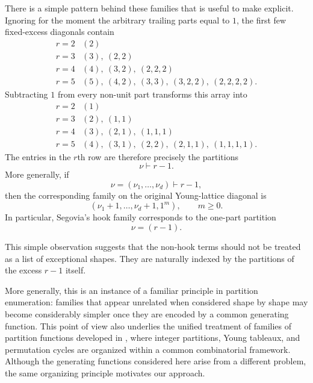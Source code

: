 \documentclass[11pt]{article}
\theoremstyle{definition}
\begin{document}
There is a simple pattern behind these families that is useful to make
explicit.  Ignoring for the moment the arbitrary trailing parts equal
to $1$, the first few fixed-excess diagonals contain
\[
\begin{array}{c|l}
 r=2 & (2) \\[1mm]
 r=3 & (3),\ (2,2) \\[1mm]
 r=4 & (4),\ (3,2),\ (2,2,2) \\[1mm]
 r=5 & (5),\ (4,2),\ (3,3),\
       (3,2,2),\ (2,2,2,2).
\end{array}
\]
Subtracting $1$ from every non-unit part transforms this array into
\[
\begin{array}{c|l}
 r=2 & (1) \\[1mm]
 r=3 & (2),\ (1,1) \\[1mm]
 r=4 & (3),\ (2,1),\ (1,1,1) \\[1mm]
 r=5 & (4),\ (3,1),\ (2,2),\
       (2,1,1),\ (1,1,1,1).
\end{array}
\]
The entries in the $r$th row are therefore precisely the partitions
\[
        \nu\vdash r-1.
\]
More generally, if
\[
        \nu=(\nu_1,\ldots,\nu_d)\vdash r-1,
\]
then the corresponding family on the original Young-lattice diagonal is
\[
        (\nu_1+1,\ldots,\nu_d+1,1^m),
        \qquad m\geq0.
\]
In particular, Segovia's hook family corresponds to the one-part partition
\[
        \nu=(r-1).
\]

This simple observation suggests that the non-hook terms should not
be treated as a list of exceptional shapes.  They are naturally
indexed by the partitions of the excess $r-1$ itself.

More generally, this is an instance of a familiar principle in
partition enumeration: families that appear unrelated when considered
shape by shape may become considerably simpler once they are encoded
by a common generating function.
This point of view also underlies the unified
treatment of families of partition functions developed in
\cite{AhmadiGomezWard2024}, where integer partitions, Young tableaux,
and permutation cycles are organized within a common combinatorial
framework.  Although the generating functions considered here arise
from a different problem, the same organizing principle motivates our
approach.
\end{document}
